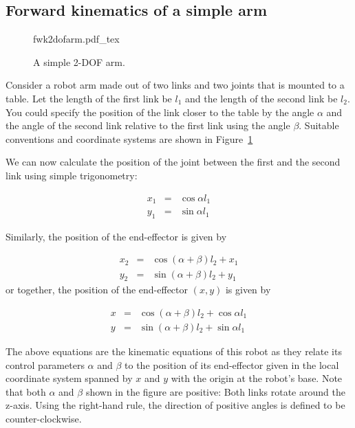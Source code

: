 \subsection{Forward kinematics of a simple arm}

\begin{figure}[!htb]%
    \centering
    \def\svgwidth{0.32\textwidth}
    {fwk2dofarm.pdf_tex}
    \caption{A simple 2-DOF arm.}\label{fig:fwk2dofarm}
\end{figure}

Consider a robot arm made out of two links and two joints that is mounted to a table. Let the length of the first link be $l_1$ and the length of the second link be $ l_2$. You could specify the position of the link closer to the table by the angle $ \alpha$ and the angle of the second link relative to the first link using the angle $ \beta$. Suitable conventions and coordinate systems are shown in Figure~\ref{fig:fwk2dofarm}

We can now calculate the position of the joint between the first and the second link using simple trigonometry:

\begin{eqnarray}\label{eq:cosxl1}
x_1 &=&\cos \alpha l_1\\
y_1 &=&\sin \alpha l_1
\end{eqnarray}

Similarly, the position of the end-effector is given by

\begin{eqnarray}
x_2&=&\cos(\alpha+\beta)l_2+x_1\\
y_2&=&\sin(\alpha+\beta)l_2+y_1
\end{eqnarray}
%
or together, the position of the end-effector $(x,y)$ is given by

\begin{eqnarray}\label{eq:cosx}
x&=&\cos(\alpha+\beta)l_2+\cos\alpha l_1\\
y&=&\sin(\alpha+\beta)l_2+\sin\alpha l_1
\end{eqnarray}

The above equations are the kinematic equations of this robot as they relate its control parameters $ \alpha$ and $\beta$ to the position of its end-effector given in the local coordinate system spanned by $ x$ and $ y$ with the origin at the robot's base. Note that both $\alpha$ and $\beta$ shown in the figure are positive: Both links rotate around the z-axis. Using the right-hand rule, the direction of positive angles is defined to be counter-clockwise.

